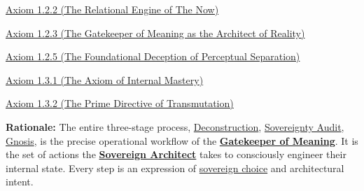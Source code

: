 \documentclass{article}
\begin{document}
\begin{description}
\begin{nobullet}
            \item \hyperref[axiom_1_2_2_the_relational_engine_of_the_now]{Axiom 1.2.2 (The Relational Engine of The Now)}
            \item \hyperref[axiom_1_2_3_the_gatekeeper_of_meaning_as_the_architect_of_reality]{Axiom 1.2.3 (The Gatekeeper of Meaning as the Architect of Reality)}
            \item \hyperref[axiom_1_2_5_the_foundational_deception_of_perceptual_separation]{Axiom 1.2.5 (The Foundational Deception of Perceptual Separation)}
            \item \hyperref[axiom_1_3_1_the_axiom_of_internal_mastery]{Axiom 1.3.1 (The Axiom of Internal Mastery)}
            \item \hyperref[axiom_1_3_2_the_prime_directive_of_transmutation]{Axiom 1.3.2 (The Prime Directive of Transmutation)}
        \end{nobullet}
    \begin{nobullet}
        \item \textbf{Rationale:} The entire three-stage process, \hyperlink{gloss:deconstruction}{Deconstruction}, \hyperlink{gloss:sovereignty_audit}{Sovereignty Audit}, \hyperlink{gloss:gnosis}{Gnosis}, is the precise operational workflow of the \textbf{\hyperlink{gloss:gatekeeper_of_meaning}{Gatekeeper of Meaning}}. It is the set of actions the \textbf{\hyperlink{gloss:sovereign_architect}{Sovereign Architect}} takes to consciously engineer their internal state. Every step is an expression of \hyperlink{gloss:sovereign_choice}{sovereign choice} and architectural intent.
    \end{nobullet}
\end{description}
\end{document}
